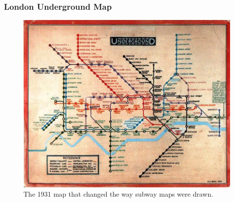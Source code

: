 \documentclass{beamer}
\begin{document}
	
	\begin{frame}
		\frametitle{London Underground Map}
		\begin{figure}
			\centering
			\includegraphics[width=\textwidth, height=0.8\textheight, keepaspectratio]{images/lu_map_1931.jpg}
			\small
			\caption{The 1931 map that changed the way subway maps were drawn.}
		\end{figure}
	\end{frame}
	
	
	
\end{document}
